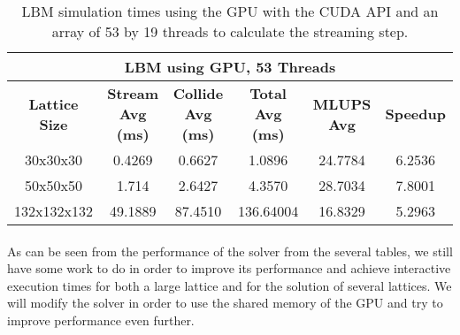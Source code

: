 \begin{table}[htbp]
  \centering
    \begin{tabular}{|c|c|c|c|c|c|}
    \toprule
    \multicolumn{6}{c}{\textbf{LBM using GPU, 53 Threads}} \\
    \midrule
    \textbf{Lattice Size	} & \textbf{Stream Avg (ms)} &	\textbf{ Collide Avg (ms)} & \textbf{Total Avg (ms)} & \textbf{MLUPS Avg} &\textbf{Speedup}\\
    30x30x30&	0.4269	&0.6627&1.0896&24.7784&6.2536\\
50x50x50&	1.714 	&2.6427 	&4.3570	&28.7034 &	7.8001\\
132x132x132	&49.1889 	&87.4510 	&136.64004 	&16.8329&	5.2963\\

    \bottomrule
    \end{tabular}%
       \caption{LBM simulation times using the GPU with the CUDA API and an array of 53 by 19 threads to calculate the streaming step.}
  \label{tab:lbm_gpu_53}%
\end{table}%

\paragraph{}As can be seen from the performance of the solver from the several tables, we still have some work to do in order to improve its performance and achieve interactive execution times for both a large lattice and for the solution of several lattices. We will modify the solver in order to use the shared memory of the GPU and try to improve performance even further. 

